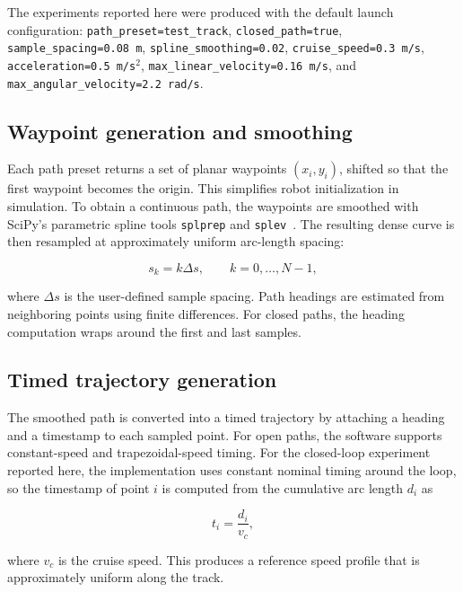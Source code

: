 \documentclass[12pt,a4paper]{cibb}
\begin{document}
The experiments reported here were produced with the default launch configuration: \texttt{path\_preset=test\_track}, \texttt{closed\_path=true}, \texttt{sample\_spacing=0.08\,m}, \texttt{spline\_smoothing=0.02}, \texttt{cruise\_speed=0.3\,m/s}, \texttt{acceleration=0.5\,m/s$^2$}, \texttt{max\_linear\_velocity=0.16\,m/s}, and \texttt{max\_angular\_velocity=2.2\,rad/s}.

\subsection{Waypoint generation and smoothing}

Each path preset returns a set of planar waypoints $(x_i, y_i)$, shifted so that the first waypoint becomes the origin. This simplifies robot initialization in simulation. To obtain a continuous path, the waypoints are smoothed with SciPy's parametric spline tools \texttt{splprep} and \texttt{splev}~\cite{scipy_splprep}. The resulting dense curve is then resampled at approximately uniform arc-length spacing:

\begin{equation}
s_k = k \Delta s, \qquad k = 0, \ldots, N-1,
\label{eq:arc_length_sampling}
\end{equation}

where $\Delta s$ is the user-defined sample spacing. Path headings are estimated from neighboring points using finite differences. For closed paths, the heading computation wraps around the first and last samples.

\subsection{Timed trajectory generation}

The smoothed path is converted into a timed trajectory by attaching a heading and a timestamp to each sampled point. For open paths, the software supports constant-speed and trapezoidal-speed timing. For the closed-loop experiment reported here, the implementation uses constant nominal timing around the loop, so the timestamp of point $i$ is computed from the cumulative arc length $d_i$ as

\begin{equation}
t_i = \frac{d_i}{v_c},
\label{eq:time_parameterization}
\end{equation}

where $v_c$ is the cruise speed. This produces a reference speed profile that is approximately uniform along the track.
\end{document}

